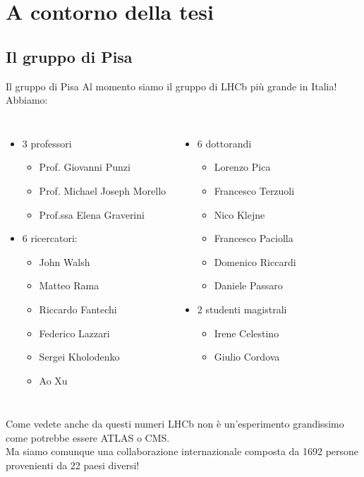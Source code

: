 \documentclass[
10pt,
aspectratio=169,
]{beamer}
\begin{document}
\section{A contorno della tesi}
\subsection{Il gruppo di Pisa}
\begin{frame}{Il gruppo di Pisa}
    Al momento siamo il gruppo di LHCb più grande in Italia!
    Abbiamo:
    \begin{columns}
    \begin{itemize}
        \item 3 professori
        \begin{itemize}
            \item Prof. Giovanni Punzi
            \item Prof. Michael Joseph Morello
            \item Prof.ssa Elena Graverini
        \end{itemize}
        \item 6 ricercatori:
        \begin{itemize}
            \item John Walsh
            \item Matteo Rama
            \item Riccardo Fantechi
            \item Federico Lazzari
            \item Sergei Kholodenko
            \item Ao Xu
        \end{itemize}
        \end{itemize}
        \begin{itemize}
        \item 6 dottorandi
        \begin{itemize}
            \item Lorenzo Pica
            \item Francesco Terzuoli
            \item Nico Klejne
            \item Francesco Paciolla
            \item Domenico Riccardi
            \item Daniele Passaro
        \end{itemize}
        \item 2 studenti magistrali
        \begin{itemize}
            \item Irene Celestino
            \item Giulio Cordova
        \end{itemize}
    \end{itemize}
        \end{columns}
        \vfill
Come vedete anche da questi numeri LHCb non è un'esperimento grandissimo come potrebbe essere ATLAS o CMS. \\
Ma siamo comunque una collaborazione internazionale composta da 1692 persone provenienti da 22 paesi diversi!
\end{frame}
\end{document}
